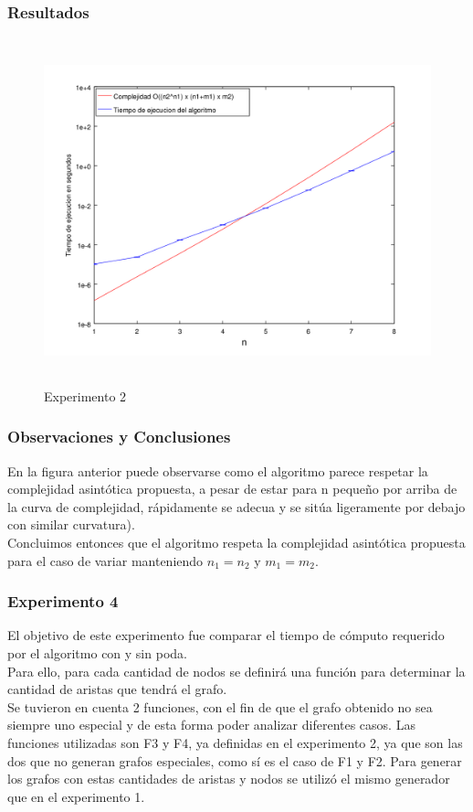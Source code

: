 \subsubsection*{Resultados}\;

    \begin{figure}[H]
      \includegraphics[height=10cm]{graficos/ejercicio2-exp3.png}
       \caption{Experimento 2}
	\end{figure}

\subsubsection*{Observaciones y Conclusiones}\;
En la figura anterior puede observarse como el algoritmo parece respetar la complejidad asintótica propuesta, a pesar de estar para n pequeño por arriba de la curva de complejidad, rápidamente se adecua y se sitúa ligeramente por debajo con similar curvatura).\\
Concluimos entonces que el algoritmo respeta la complejidad asintótica propuesta para el caso de variar manteniendo $n_1=n_2$ y $m_1=m_2$.

\subsubsection*{Experimento 4}\;
\noindent  El objetivo de este experimento fue comparar el tiempo de cómputo requerido por el algoritmo con y sin poda. \\
Para ello, para cada cantidad de nodos se definirá una función para determinar la cantidad de aristas que tendrá el grafo. \\
Se tuvieron en cuenta 2 funciones, con el fin de que el grafo obtenido no sea siempre uno especial y de esta forma poder analizar diferentes casos. Las funciones utilizadas son F3 y F4, ya definidas en el experimento 2, ya que son las dos que no generan grafos especiales, como sí es el caso de F1 y F2.
Para generar los grafos con estas cantidades de aristas y nodos se utilizó el mismo generador que en el experimento 1. 
     	
